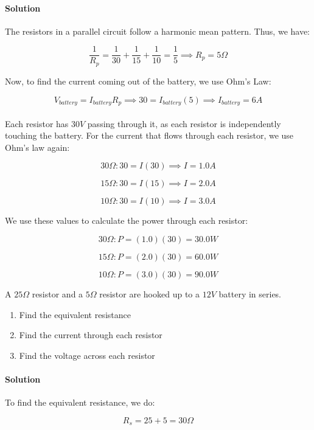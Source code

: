 \documentclass{scrartcl}
\theoremstyle{definition}
\begin{document}
	\paragraph{Solution} The resistors in a parallel circuit follow a harmonic mean pattern. Thus, we have:
	
	$$
	\frac{1}{R_p} = \frac{1}{30} + \frac{1}{15} + \frac{1}{10} = \frac{1}{5} \implies \boxed{R_p = 5 \Omega}
	$$
	
	\noindent Now, to find the current coming out of the battery, we use Ohm's Law:
	
	$$
	V_{battery} = I_{battery} R_p \implies 30 = I_{battery} (5) \implies \boxed{I_{battery} = 6 A}
	$$ \\ 
	
	\noindent Each resistor has $30V$ passing through it, as each resistor is independently touching the battery. For the current that flows through each resistor, we use Ohm's law again:
	
	$$
	30\Omega : 30 = I(30) \implies \boxed{I = 1.0 A}
	$$
	
	$$
	15 \Omega: 30 = I(15) \implies \boxed{I = 2.0A}
	$$
	
	$$
	10 \Omega: 30 = I(10) \implies \boxed{I = 3.0A}
	$$
	
	\noindent We use these values to calculate the power through each resistor:
	
	$$
	30 \Omega: P = (1.0)(30) = \boxed{30.0 W}
	$$
	
	$$
	15 \Omega: P = (2.0)(30) = \boxed{60.0 W}
	$$
	
	$$
	10 \Omega: P = (3.0)(30) = \boxed{90.0 W}
	$$
	
	\begin{example}
		A $25 \Omega$ resistor and a $5 \Omega$ resistor are hooked up to a $12V$ battery in series. 
		\begin{enumerate}
			\item Find the equivalent resistance
			\item Find the current through each resistor
			\item Find the voltage across each resistor
		\end{enumerate}
	\end{example}
	
	\paragraph{Solution} To find the equivalent resistance, we do:
	
	$$
	R_s = 25 + 5 = \boxed{30 \Omega}
	$$
	
\end{document}
